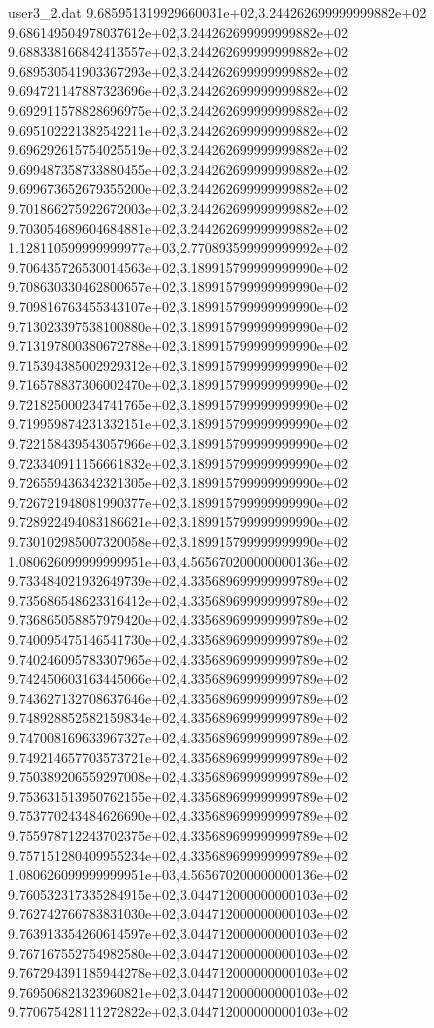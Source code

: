 \begin{filecontents}{user3_2.dat}
9.685951319929660031e+02,3.244262699999999882e+02
9.686149504978037612e+02,3.244262699999999882e+02
9.688338166842413557e+02,3.244262699999999882e+02
9.689530541903367293e+02,3.244262699999999882e+02
9.694721147887323696e+02,3.244262699999999882e+02
9.692911578828696975e+02,3.244262699999999882e+02
9.695102221382542211e+02,3.244262699999999882e+02
9.696292615754025519e+02,3.244262699999999882e+02
9.699487358733880455e+02,3.244262699999999882e+02
9.699673652679355200e+02,3.244262699999999882e+02
9.701866275922672003e+02,3.244262699999999882e+02
9.703054689604684881e+02,3.244262699999999882e+02
1.128110599999999977e+03,2.770893599999999992e+02
9.706435726530014563e+02,3.189915799999999990e+02
9.708630330462800657e+02,3.189915799999999990e+02
9.709816763455343107e+02,3.189915799999999990e+02
9.713023397538100880e+02,3.189915799999999990e+02
9.713197800380672788e+02,3.189915799999999990e+02
9.715394385002929312e+02,3.189915799999999990e+02
9.716578837306002470e+02,3.189915799999999990e+02
9.721825000234741765e+02,3.189915799999999990e+02
9.719959874231332151e+02,3.189915799999999990e+02
9.722158439543057966e+02,3.189915799999999990e+02
9.723340911156661832e+02,3.189915799999999990e+02
9.726559436342321305e+02,3.189915799999999990e+02
9.726721948081990377e+02,3.189915799999999990e+02
9.728922494083186621e+02,3.189915799999999990e+02
9.730102985007320058e+02,3.189915799999999990e+02
1.080626099999999951e+03,4.565670200000000136e+02
9.733484021932649739e+02,4.335689699999999789e+02
9.735686548623316412e+02,4.335689699999999789e+02
9.736865058857979420e+02,4.335689699999999789e+02
9.740095475146541730e+02,4.335689699999999789e+02
9.740246095783307965e+02,4.335689699999999789e+02
9.742450603163445066e+02,4.335689699999999789e+02
9.743627132708637646e+02,4.335689699999999789e+02
9.748928852582159834e+02,4.335689699999999789e+02
9.747008169633967327e+02,4.335689699999999789e+02
9.749214657703573721e+02,4.335689699999999789e+02
9.750389206559297008e+02,4.335689699999999789e+02
9.753631513950762155e+02,4.335689699999999789e+02
9.753770243484626690e+02,4.335689699999999789e+02
9.755978712243702375e+02,4.335689699999999789e+02
9.757151280409955234e+02,4.335689699999999789e+02
1.080626099999999951e+03,4.565670200000000136e+02
9.760532317335284915e+02,3.044712000000000103e+02
9.762742766783831030e+02,3.044712000000000103e+02
9.763913354260614597e+02,3.044712000000000103e+02
9.767167552754982580e+02,3.044712000000000103e+02
9.767294391185944278e+02,3.044712000000000103e+02
9.769506821323960821e+02,3.044712000000000103e+02
9.770675428111272822e+02,3.044712000000000103e+02

\end{filecontents}
